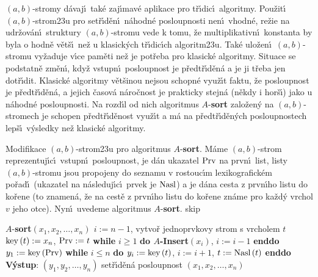 \flushpar$\left(a,b\right)$-stromy d\'avaj\'\i\ tak\'e zaj\'\i mav\'e aplikace pro 
t\v r\'\i dic\'\i\ 
algoritmy. Pou\v zit\'\i\ $\left(a,b\right)$-strom\accent23u pro set\v r\'\i d\v en\'\i\ 
n\'ahodn\'e posloupnosti nen\'\i\ vhodn\'e, re\v zie na udr\v zov\'an\'\i\ 
struktury $\left(a,b\right)$-stromu vede k tomu, \v ze multiplikativn\'\i\ 
konstanta by byla o hodn\v e v\v et\v s\'\i\ ne\v z u klasick\'ych 
t\v r\'\i dic\'\i ch algoritm\accent23u. Tak\'e ulo\v zen\'\i\ $\left(
a,b\right)$-stromu 
vy\v zaduje v\'\i ce pam\v eti ne\v z je pot\v reba pro klasick\'e 
algoritmy. Situace se podstatn\v e zm\v en\'\i , kdy\v z vstupn\'\i\ 
posloupnost je p\v red\-t\v r\'\i\-d\v en\'a a je ji t\v reba jen dot\v r\'\i dit. 
Klasick\'e algoritmy v\v et\v sinou nejsou schopn\'e vyu\v z\'\i t faktu, \v ze 
posloupnost je p\v redt\v r\'\i d\v en\'a, a jejich \v casov\'a n\'aro\v cnost je 
prakticky stejn\'a (n\v ekdy i hor\v s\'\i ) jako u n\'ahodn\'e 
posloupnosti. Na rozd\'\i l od nich algoritmus $A$-{\bf sort }
zalo\v zen\'y na $\left(a,b\right)$-stromech je schopen p\v redt\v r\'\i d\v enost 
vyu\v z\'\i t a m\'a na p\v redt\v r\'\i d\v en\'ych posloupnostech lep\v s\'\i\ 
v\'ysledky ne\v z klasick\'e algoritmy.
\medskip

\flushpar Modifikace $\left(a,b\right)$-strom\accent23u pro algoritmus 
$A$-{\bf sort}. M\'ame $\left(a,b\right)$-strom reprezentuj\'\i c\'\i\ vstupn\'\i\ 
posloupnost, je d\'an ukazatel $\operatorname{Prv}$ na prvn\'\i\ list, listy 
$\left(a,b\right)$-stromu jsou propojeny do seznamu v rostouc\'\i m 
lexikografick\'em po\v rad\'\i\ (ukazatel na n\'asleduj\'\i c\'\i\ prvek je 
$\operatorname{Nasl}$) a je d\'ana cesta z prvn\'\i ho listu do ko\v rene (to 
znamen\'a, \v ze na cest\v e z prvn\'\i ho listu do ko\v rene zn\'ame 
pro ka\v zd\'y vrchol $v$ jeho otce). Nyn\'\i\ uvedeme algoritmus 
$A$-{\bf sort}. 
skip

$A$-{\bf sort$\left(x_1,x_2,\dots,x_n\right)$\newline 
$i:=n-1$}, vytvo\v r jednoprvkovy strom s vrcholem $t$\newline 
$\operatorname{key}\left(t\right):=x_n$, $\operatorname{Prv}:=t$\newline 
{\bf while} $i\ge 1$ {\bf do $A$-Insert$\left(x_i\right)$}, $i:=i-1$ {\bf enddo}\newline 
$y_1:=\operatorname{key}\left(\operatorname{Prv}\right)$\newline 
{\bf while} $i\le n$ {\bf do\newline 
\phantom{---}$y_i:=\operatorname{key}\left(t\right)$}, $i:=i+1$, $t:=\operatorname{Nasl}\left(t\right)$\newline 
{\bf enddo\newline 
V\'ystup}: $\left(y_1,y_2,\dots,y_n\right)$ set\v r\'\i d\v en\'a posloupnost $
\left(x_1,x_2,\dots,x_n\right)$
\medskip

